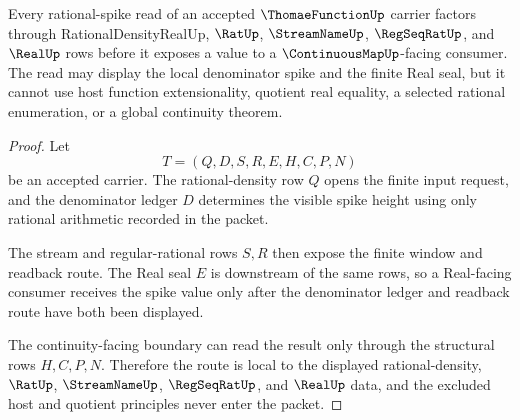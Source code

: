 \begin{theorem}
\label{thm:thomae-function-rational-spike-locality}
Every rational-spike read of an accepted $\ThomaeFunctionUp$ carrier factors through RationalDensityRealUp, $\RatUp$, $\StreamNameUp$, $\RegSeqRatUp$, and $\RealUp$ rows before it exposes a value to a $\ContinuousMapUp$-facing consumer. The read may display the local denominator spike and the finite Real seal, but it cannot use host function extensionality, quotient real equality, a selected rational enumeration, or a global continuity theorem.
\end{theorem}
\begin{proof}
Let
$$
T=(Q,D,S,R,E,H,C,P,N)
$$
be an accepted carrier. The rational-density row $Q$ opens the finite input request, and the denominator ledger $D$ determines the visible spike height using only rational arithmetic recorded in the packet.

The stream and regular-rational rows $S,R$ then expose the finite window and readback route. The Real seal $E$ is downstream of the same rows, so a Real-facing consumer receives the spike value only after the denominator ledger and readback route have both been displayed.

The continuity-facing boundary can read the result only through the structural rows $H,C,P,N$. Therefore the route is local to the displayed rational-density, $\RatUp$, $\StreamNameUp$, $\RegSeqRatUp$, and $\RealUp$ data, and the excluded host and quotient principles never enter the packet.
\end{proof}

